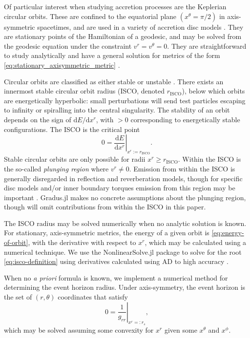 \documentclass[fleqn,usenatbib]{mnras}
\newcommand{\software}[1]{{\sc #1}}
\newcommand{\Gradus}{\software{Gradus.jl}\xspace}
\renewcommand{\d}{\text{d}}
\newcommand{\risco}{r_\text{ISCO}}
\begin{document}
Of particular interest when studying accretion processes are the Keplerian
circular orbits. These are confined to the equatorial plane $(x^\theta = \pi/2)$
in axis-symmetric spacetimes, and are used in a variety of accretion disc models
\citep{shakura_black_1973, sadowski_relativistic_2011}. They are stationary
points of the Hamiltonian of a geodesic, and may be solved from the geodesic
equation under the constraint $v^r = v^\theta = 0$. They are straightforward to
study analytically and have a general solution for metrics of the form
\eqref{eq:stationary_axisymmetric_metric} \citep[see e.g.][and
an extension towards $a^\mu \neq 0$ in Appendix
\ref{appendix:circular-orbits}]{johannsen_regular_2013}.

Circular orbits are classified as either stable or unstable
\citep{wilkins_bound_1972,bardeen_rotating_1972}. There exists an innermost
stable circular orbit radius (ISCO, denoted $\risco$), below which orbits
are energetically hyperbolic: small perturbations will send test particles
escaping to infinity or spiralling into the central singularity. The stability of
an orbit depends on the sign of $\d E / \d x^r$, with $>0$ corresponding to
energetically stable configurations. The ISCO is the critical point
\begin{equation}
    \label{eq:isco-definition}
    0 = \left. \frac{\d E}{\d x^r} \right\rvert_{x^r := \risco}.
\end{equation}
Stable circular orbits are only possible for radii $x^r \geq \risco$. Within the
ISCO is the so-called \textit{plunging region} where $v^r \neq 0$. Emission from
within the ISCO is generally disregarded in reflection and reverberation models,
though for specific disc models and/or inner boundary torques emission from this
region may be important \citep[see e.g.][]{reynolds_isco_1997,young_isco_1998,
mummery_continuum_2024}.  \Gradus makes no concrete assumptions about the
plunging region, though will omit contributions from within the ISCO in this
paper.

The ISCO radius may be solved numerically when no analytic solution is known.
For stationary, axis-symmetric metrics, the energy of a given orbit is
\eqref{eq:energy-of-orbit}, with the derivative with respect to $x^r$, which may
be calculated using a numerical technique. We use the NonlinearSolve.jl package
to solve for the root \ref{eq:isco-definition} using derivatives calculated
using AD to high accuracy \citep{Pal_NonlinearSolve_jl_2023}.

When no \textit{a priori} formula is known, we implement a numerical method for
determining the event horizon radius.  Under axis-symmetry, the event horizon is
the set of $(r, \theta)$ coordinates that satisfy
\begin{equation}
    \label{eq:event_horizon}
    0 = \left. \frac{1}{g_{rr}} \right\rvert_{x^r =: r_s},
\end{equation}
which may be solved assuming some convexity for $x^r$ given some $x^\theta$ and
$x^\phi$.
\end{document}
